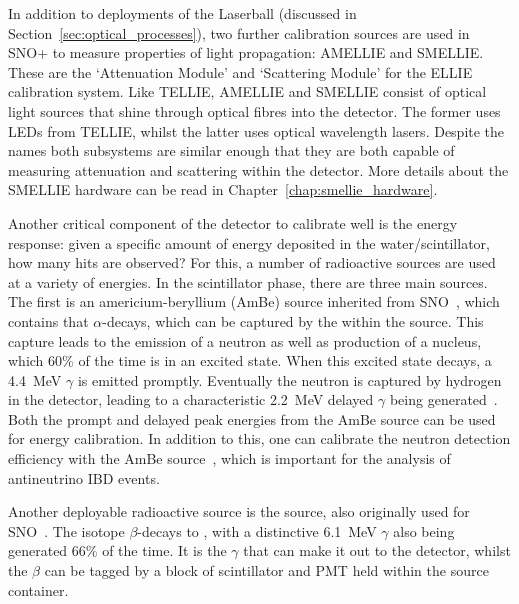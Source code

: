 In addition to deployments of the Laserball (discussed in Section~\ref{sec:optical_processes}), two further calibration sources are used in SNO+ to measure properties of light propagation: AMELLIE and SMELLIE. These are the `Attenuation Module' and `Scattering Module' for the ELLIE calibration system. Like TELLIE, AMELLIE and SMELLIE consist of optical light sources that shine through optical fibres into the detector. The former uses LEDs from TELLIE, whilst the latter uses optical wavelength lasers. Despite the names both subsystems are similar enough that they are both capable of measuring attenuation and scattering within the detector. More details about the SMELLIE hardware can be read in Chapter~\ref{chap:smellie_hardware}.

Another critical component of the detector to calibrate well is the energy response: given a specific amount of energy deposited in the water/scintillator, how many hits are observed? For this, a number of radioactive sources are used at a variety of energies. In the scintillator phase, there are three main sources. The first is an americium-beryllium (AmBe) source inherited from SNO~\cite{loachMeasurementFlux8B2008}, %
which contains  that $\alpha$-decays, which can be captured by the  within the source. This capture leads to the emission of a neutron as well as production of a  nucleus, which 60\% of the time is in  an excited state. When this excited state decays, a \SI{4.4}{\MeV} $\gamma$ is emitted promptly. Eventually the neutron is captured by hydrogen in the detector, leading to a characteristic \SI{2.2}{\MeV} delayed $\gamma$ being generated~\cite{albaneseSNOExperiment2021}. %
Both the prompt and delayed peak energies from the AmBe source can be used for energy calibration. In addition to this, one can calibrate the neutron detection efficiency with the AmBe source~\cite{loachMeasurementFlux8B2008}, %
which is important for the analysis of antineutrino IBD events. %

Another deployable radioactive source is the  source, also originally used for SNO~\cite{dragowsky16NCalibrationSource2002}. %
The  isotope $\beta$-decays to , with a distinctive \SI{6.1}{\MeV} $\gamma$ also being generated 66\% of the time. It is the $\gamma$ that can make it out to the detector, whilst the $\beta$ can be tagged by a block of scintillator and PMT held within the source container.

